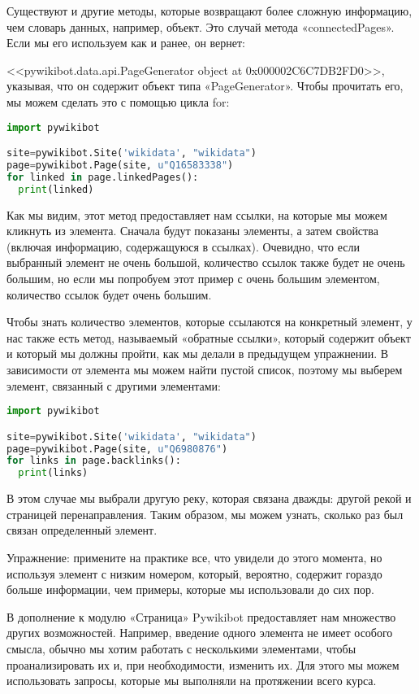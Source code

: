Существуют и другие методы, которые возвращают более сложную информацию, чем словарь данных, например, объект. Это случай метода «connectedPages». Если мы его используем как и ранее, он вернет: 

<<pywikibot.data.api.PageGenerator object at 0x000002C6C7DB2FD0>>, 
указывая, что он содержит объект типа «PageGenerator». Чтобы прочитать его, мы можем сделать это с помощью цикла for:

\begin{lstlisting}[language=Python]
import pywikibot

site=pywikibot.Site('wikidata', "wikidata")
page=pywikibot.Page(site, u"Q16583338")
for linked in page.linkedPages():
  print(linked)
\end{lstlisting}

Как мы видим, этот метод предоставляет нам ссылки, на которые мы можем кликнуть из элемента. Сначала будут показаны элементы, а затем свойства (включая информацию, содержащуюся в ссылках). Очевидно, что если выбранный элемент не очень большой, количество ссылок также будет не очень большим, но если мы попробуем этот пример с очень большим элементом, количество ссылок будет очень большим.

Чтобы знать количество элементов, которые ссылаются на конкретный элемент, у нас также есть метод, называемый «обратные ссылки», который содержит объект и который мы должны пройти, как мы делали в предыдущем упражнении. В зависимости от элемента мы можем найти пустой список, поэтому мы выберем элемент, связанный с другими элементами:

\begin{lstlisting}[language=Python]
import pywikibot

site=pywikibot.Site('wikidata', "wikidata")
page=pywikibot.Page(site, u"Q6980876")
for links in page.backlinks():
  print(links)
\end{lstlisting}

В этом случае мы выбрали другую реку, которая связана дважды: другой рекой и страницей перенаправления. Таким образом, мы можем узнать, сколько раз был связан определенный элемент.

Упражнение: примените на практике все, что увидели до этого момента, но используя элемент с низким номером, который, вероятно, содержит гораздо больше информации, чем примеры, которые мы использовали до сих пор.

В дополнение к модулю «Страница» Pywikibot предоставляет нам множество других возможностей. Например, введение одного элемента не имеет особого смысла, обычно мы хотим работать с несколькими элементами, чтобы проанализировать их и, при необходимости, изменить их. Для этого мы можем использовать запросы, которые мы выполняли на протяжении всего курса.